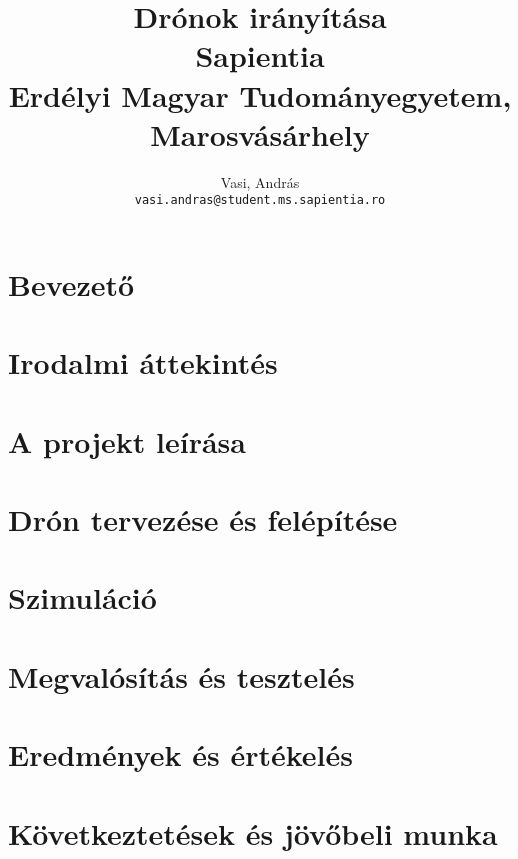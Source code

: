\documentclass[12pt, twosides]{report}
\title{
	{Drónok irányítása}\\
	{\large Sapientia\\
	Erdélyi Magyar Tudományegyetem, Marosvásárhely}
}
\author{
	Vasi, András\\
	\texttt{vasi.andras@student.ms.sapientia.ro}	
}
\begin{document}


\tableofcontents

\listoffigures


\chapter{Bevezető}


\chapter{Irodalmi áttekintés}


\chapter{A projekt leírása}


\chapter{Drón tervezése és felépítése}


\chapter{Szimuláció}


\chapter{Megvalósítás és tesztelés}


\chapter{Eredmények és értékelés}


\chapter{Következtetések és jövőbeli munka}




\end{document}
